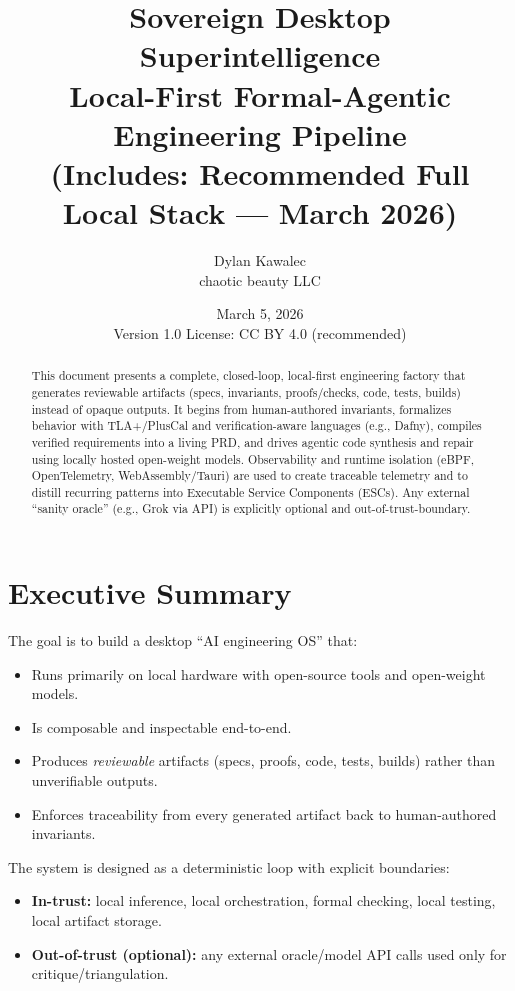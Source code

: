 \documentclass[11pt]{article}
\title{\textbf{Sovereign Desktop Superintelligence}\\
\large Local-First Formal-Agentic Engineering Pipeline\\
\vspace{0.25em}
\small (Includes: Recommended Full Local Stack --- March 2026)}
\author{Dylan Kawalec\\\small chaotic beauty LLC}
\date{March 5, 2026\\\small Version 1.0 \quad\textbar\quad License: CC BY 4.0 (recommended)}
\begin{document}
\maketitle

\begin{abstract}
This document presents a complete, closed-loop, local-first engineering factory that generates
reviewable artifacts (specs, invariants, proofs/checks, code, tests, builds) instead of opaque outputs.
It begins from human-authored invariants, formalizes behavior with TLA+/PlusCal and verification-aware
languages (e.g., Dafny), compiles verified requirements into a living PRD, and drives agentic code synthesis
and repair using locally hosted open-weight models. Observability and runtime isolation (eBPF, OpenTelemetry,
WebAssembly/Tauri) are used to create traceable telemetry and to distill recurring patterns into Executable Service
Components (ESCs). Any external “sanity oracle” (e.g., Grok via API) is explicitly optional and out-of-trust-boundary.
\end{abstract}

\tableofcontents
\newpage

\section{Executive Summary}

The goal is to build a desktop ``AI engineering OS'' that:
\begin{itemize}
  \item Runs primarily on local hardware with open-source tools and open-weight models.
  \item Is composable and inspectable end-to-end.
  \item Produces \emph{reviewable} artifacts (specs, proofs, code, tests, builds) rather than unverifiable outputs.
  \item Enforces traceability from every generated artifact back to human-authored invariants.
\end{itemize}

The system is designed as a deterministic loop with explicit boundaries:
\begin{itemize}
  \item \textbf{In-trust:} local inference, local orchestration, formal checking, local testing, local artifact storage.
  \item \textbf{Out-of-trust (optional):} any external oracle/model API calls used only for critique/triangulation.
\end{itemize}
\end{document}
